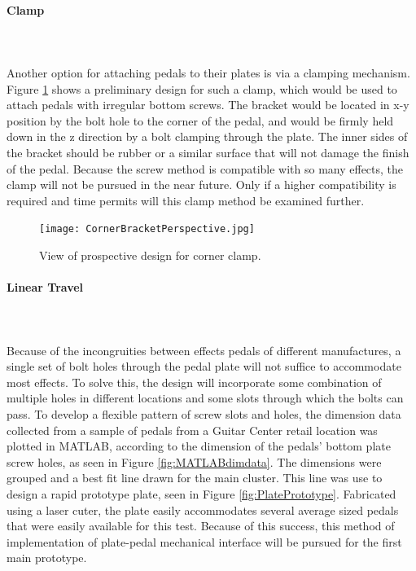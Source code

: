 \documentclass{article}
\begin{document}
			\paragraph{Clamp}\\\\
			Another option for attaching pedals to their plates is via a clamping mechanism.  Figure \ref{fig:CornerClamp} shows a preliminary design for such a clamp, which would be used to attach pedals with irregular bottom screws.  The bracket would be located in x-y position by the bolt hole to the corner of the pedal, and would be firmly held down in the z direction by a bolt clamping through the plate. The inner sides of the bracket should be rubber or a similar surface that will not damage the finish of the pedal. \color{black} Because the screw method is compatible with so many effects, the clamp will not be pursued in the near future.  Only if a higher compatibility is required and time permits will this clamp method be examined further. \color{grey}

			\begin{figure}
				\centering
				\texttt{[image: CornerBracketPerspective.jpg]}
				\caption{View of prospective design for corner clamp.}
				\label{fig:CornerClamp}
			\end{figure}

			\paragraph{Linear Travel}\\\\
			Because of the incongruities between effects pedals of different manufactures, a single set of bolt holes through the pedal plate will not suffice to accommodate most effects.  To solve this, the design will incorporate some combination of multiple holes in different locations and some slots through which the bolts can pass.
			\color{black}
			To develop a flexible pattern of screw slots and holes, the dimension data collected from a sample of pedals from a Guitar Center retail location \cite{MyDimData} was plotted in MATLAB, according to the dimension of the pedals' bottom plate screw holes, as seen in Figure \ref{fig:MATLABdimdata}.  The dimensions were grouped and a best fit line drawn for the main cluster.  This line was use to design a rapid prototype plate, seen in Figure \ref{fig:PlatePrototype}.  Fabricated using a laser cuter, the plate easily accommodates several average sized pedals that were easily available for this test.  Because of this success, this method of implementation of plate-pedal mechanical interface will be pursued for the first main prototype.
\end{document}
